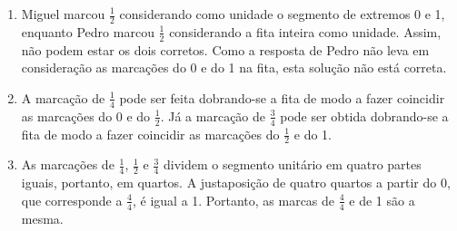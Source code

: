\begin{multicols}{2}
\begin{solucao}{}{}
\begin{enumerate} [\quad a)] %
    \item Miguel marcou $\frac{1}{2}$ considerando como unidade o segmento de extremos 0 e 1, enquanto Pedro marcou $\frac{1}{2}$ considerando a fita inteira como unidade. Assim, não podem estar os dois corretos. Como a resposta de Pedro não leva em consideração as marcações do 0 e do 1 na fita, esta solução não está correta.
\begin{center}
\end{center}
    \item       A marcação de       $\frac{1}{4}$       pode ser feita dobrando-se a fita de modo a fazer coincidir as marcações do 0 e do        $\frac{1}{2}$. Já a marcação de       $\frac{3}{4}$     pode ser obtida dobrando-se a fita de modo a fazer coincidir as marcações do       $\frac{1}{2}$       e do 1.

\begin{center}
\end{center}

    \item       As marcações de       $\frac{1}{4}$,        $\frac{1}{2}$       e       $\frac{3}{4}$       dividem o segmento unitário em quatro partes iguais, portanto, em quartos. A justaposição de quatro quartos a partir do 0, que corresponde a       $\frac{4}{4}$, é igual a 1.  Portanto, as marcas de       $\frac{4}{4}$       e de 1 são a mesma.

\begin{center}
\end{center}


\end{enumerate}
\end{solucao}
\end{multicols}
